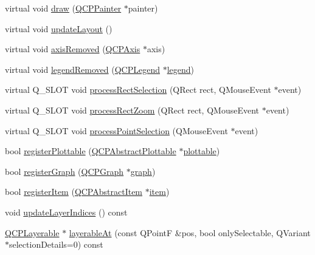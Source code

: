 \begin{DoxyCompactItemize}
\item 
virtual void \hyperlink{class_q_custom_plot_ad7a7d878bf050f101a43008e7d8fdb52}{draw} (\hyperlink{class_q_c_p_painter}{Q\+C\+P\+Painter} $\ast$painter)
\item 
virtual void \hyperlink{class_q_custom_plot_a6e6693e2c249f65437382ffd93405e04}{update\+Layout} ()
\item 
virtual void \hyperlink{class_q_custom_plot_a8b46607021c463c94709d3504951cb47}{axis\+Removed} (\hyperlink{class_q_c_p_axis}{Q\+C\+P\+Axis} $\ast$axis)
\item 
virtual void \hyperlink{class_q_custom_plot_a9d173454555021c9ffd4f675c4d9037a}{legend\+Removed} (\hyperlink{class_q_c_p_legend}{Q\+C\+P\+Legend} $\ast$\hyperlink{class_q_custom_plot_a4eadcd237dc6a09938b68b16877fa6af}{legend})
\item 
virtual Q\+\_\+\+S\+L\+OT void \hyperlink{class_q_custom_plot_ac10849411e1d0e858ea7f29c8ade364c}{process\+Rect\+Selection} (Q\+Rect rect, Q\+Mouse\+Event $\ast$event)
\item 
virtual Q\+\_\+\+S\+L\+OT void \hyperlink{class_q_custom_plot_a5508a207dcc279f316142f96d984bba3}{process\+Rect\+Zoom} (Q\+Rect rect, Q\+Mouse\+Event $\ast$event)
\item 
virtual Q\+\_\+\+S\+L\+OT void \hyperlink{class_q_custom_plot_ac13c10fff6613e3e80e13c787b010838}{process\+Point\+Selection} (Q\+Mouse\+Event $\ast$event)
\item 
bool \hyperlink{class_q_custom_plot_aeba7733bb9fadfb5a375b3f40de9e58a}{register\+Plottable} (\hyperlink{class_q_c_p_abstract_plottable}{Q\+C\+P\+Abstract\+Plottable} $\ast$\hyperlink{class_q_custom_plot_a32de81ff53e263e785b83b52ecd99d6f}{plottable})
\item 
bool \hyperlink{class_q_custom_plot_acfc01230bddaea4f1782e4aa7d130af6}{register\+Graph} (\hyperlink{class_q_c_p_graph}{Q\+C\+P\+Graph} $\ast$\hyperlink{class_q_custom_plot_a6d3ed93c2bf46ab7fa670d66be4cddaf}{graph})
\item 
bool \hyperlink{class_q_custom_plot_afbd4010b2e3f364c8d512691b2a1640a}{register\+Item} (\hyperlink{class_q_c_p_abstract_item}{Q\+C\+P\+Abstract\+Item} $\ast$\hyperlink{class_q_custom_plot_a3e842b5a65b1d17fbb96cfb1fa1314d1}{item})
\item 
void \hyperlink{class_q_custom_plot_a3117754df3a5638787a6223c7147970f}{update\+Layer\+Indices} () const 
\item 
\hyperlink{class_q_c_p_layerable}{Q\+C\+P\+Layerable} $\ast$ \hyperlink{class_q_custom_plot_a3fffd1d8364f657482ae985e0b5aa028}{layerable\+At} (const Q\+PointF \&pos, bool only\+Selectable, Q\+Variant $\ast$selection\+Details=0) const 

\end{DoxyCompactItemize}

